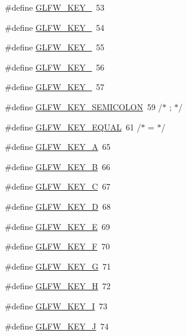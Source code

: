 \begin{DoxyCompactItemize}
\#define \hyperlink{group__keys_ga4d74ddaa5d4c609993b4d4a15736c924}{G\+L\+F\+W\+\_\+\+K\+E\+Y\+\_}~53
\item 
\#define \hyperlink{group__keys_ga9ea4ab80c313a227b14d0a7c6f810b5d}{G\+L\+F\+W\+\_\+\+K\+E\+Y\+\_}~54
\item 
\#define \hyperlink{group__keys_gab79b1cfae7bd630cfc4604c1f263c666}{G\+L\+F\+W\+\_\+\+K\+E\+Y\+\_}~55
\item 
\#define \hyperlink{group__keys_gadeaa109a0f9f5afc94fe4a108e686f6f}{G\+L\+F\+W\+\_\+\+K\+E\+Y\+\_}~56
\item 
\#define \hyperlink{group__keys_ga2924cb5349ebbf97c8987f3521c44f39}{G\+L\+F\+W\+\_\+\+K\+E\+Y\+\_}~57
\item 
\#define \hyperlink{group__keys_ga84233de9ee5bb3e8788a5aa07d80af7d}{G\+L\+F\+W\+\_\+\+K\+E\+Y\+\_\+\+S\+E\+M\+I\+C\+O\+L\+O\+N}~59  /$\ast$ ; $\ast$/
\item 
\#define \hyperlink{group__keys_gae1a2de47240d6664423c204bdd91bd17}{G\+L\+F\+W\+\_\+\+K\+E\+Y\+\_\+\+E\+Q\+U\+A\+L}~61  /$\ast$ = $\ast$/
\item 
\#define \hyperlink{group__keys_ga03e842608e1ea323370889d33b8f70ff}{G\+L\+F\+W\+\_\+\+K\+E\+Y\+\_\+\+A}~65
\item 
\#define \hyperlink{group__keys_ga8e3fb647ff3aca9e8dbf14fe66332941}{G\+L\+F\+W\+\_\+\+K\+E\+Y\+\_\+\+B}~66
\item 
\#define \hyperlink{group__keys_ga00ccf3475d9ee2e679480d540d554669}{G\+L\+F\+W\+\_\+\+K\+E\+Y\+\_\+\+C}~67
\item 
\#define \hyperlink{group__keys_ga011f7cdc9a654da984a2506479606933}{G\+L\+F\+W\+\_\+\+K\+E\+Y\+\_\+\+D}~68
\item 
\#define \hyperlink{group__keys_gabf48fcc3afbe69349df432b470c96ef2}{G\+L\+F\+W\+\_\+\+K\+E\+Y\+\_\+\+E}~69
\item 
\#define \hyperlink{group__keys_ga5df402e02aca08444240058fd9b42a55}{G\+L\+F\+W\+\_\+\+K\+E\+Y\+\_\+\+F}~70
\item 
\#define \hyperlink{group__keys_gae74ecddf7cc96104ab23989b1cdab536}{G\+L\+F\+W\+\_\+\+K\+E\+Y\+\_\+\+G}~71
\item 
\#define \hyperlink{group__keys_gad4cc98fc8f35f015d9e2fb94bf136076}{G\+L\+F\+W\+\_\+\+K\+E\+Y\+\_\+\+H}~72
\item 
\#define \hyperlink{group__keys_ga274655c8bfe39742684ca393cf8ed093}{G\+L\+F\+W\+\_\+\+K\+E\+Y\+\_\+\+I}~73
\item 
\#define \hyperlink{group__keys_ga65ff2aedb129a3149ad9cb3e4159a75f}{G\+L\+F\+W\+\_\+\+K\+E\+Y\+\_\+\+J}~74

\end{DoxyCompactItemize}
